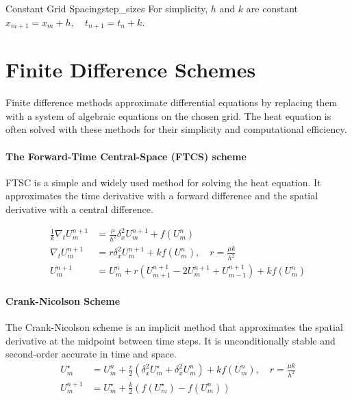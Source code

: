 \begin{remark}{Constant Grid Spacing}{step_sizes}
  For simplicity, \(h\) and \(k\) are constant \( x_{m+1} = x_m + h,\quad t_{n+1} = t_n + k \).
\end{remark}

\section{Finite Difference Schemes}

Finite difference methods approximate differential equations by replacing them with a system of algebraic equations on the chosen grid.
The heat equation is often solved with these methods for their simplicity and computational efficiency.

\paragraph{The Forward-Time Central-Space (FTCS) scheme}

FTSC is a simple and widely used method for solving the heat equation.
It approximates the time derivative with a forward difference and the spatial derivative with a central difference.


\begin{align*}
  \frac{1}{k} \nabla_t U_m^{n+1} & = \frac{\mu}{h^2} \delta_x^2 U_m^{n+1} + f(U_m^n)                                              \\
  \nabla_t U_m^{n+1}             & = r \delta_x^2 U_m^{n+1} + k f(U_m^n), \quad r = \frac{\mu k}{h^2}                             \\
  U_m^{n+1}                      & = U_m^n + r \left( U_{m+1}^{n+1} - 2 U_m^{n+1} + U_{m-1}^{n+1} \right) + k f(U_m^n) \tag{FTCS}
\end{align*}

\paragraph{Crank-Nicolson Scheme}

The Crank-Nicolson scheme is an implicit method that approximates the spatial derivative at the midpoint between time steps. It is unconditionally stable and second-order accurate in time and space.
\begin{align*}
  U_m^\star & = U_m^n + \frac{r}{2} \left( \delta_x^2 U_m^\star + \delta_x^2 U_m^n \right) + k f(U_m^n), \quad r = \frac{\mu k}{h^2} \\
  U_m^{n+1} & = U_m^\star + \frac{k}{2} \left( f(U_m^\star) - f(U_m^n) \right) \tag{Crank-Nicolson}
\end{align*}



